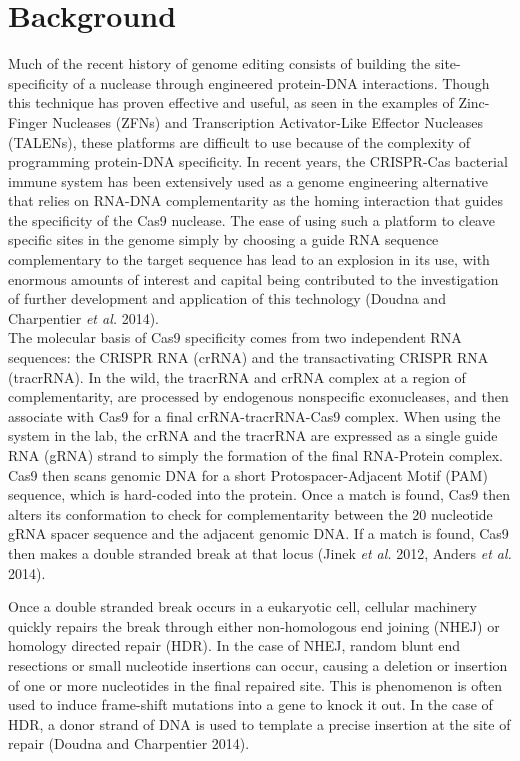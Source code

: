 \chapter{Background}
\label{Background}

Much of the recent history of genome editing consists of building the site-specificity of a nuclease through engineered protein-DNA interactions. Though this technique has proven effective and useful, as seen in the examples of Zinc-Finger Nucleases (ZFNs) and Transcription Activator-Like Effector Nucleases (TALENs), these platforms are difficult to use because of the complexity of programming protein-DNA specificity. In recent years, the CRISPR-Cas bacterial immune system has been extensively used as a genome engineering alternative that relies on RNA-DNA complementarity as the homing interaction that guides the specificity of the Cas9 nuclease. The ease of using such a platform to cleave specific sites in the genome simply by choosing a guide RNA sequence complementary to the target sequence has lead to an explosion in its use, with enormous amounts of interest and capital being contributed to the investigation of further development and application of this technology (Doudna and Charpentier \textit{et al.} 2014).\\

The molecular basis of Cas9 specificity comes from two independent RNA sequences: the CRISPR RNA (crRNA) and the transactivating CRISPR RNA (tracrRNA). In the wild, the tracrRNA and crRNA complex at a region of complementarity, are processed by endogenous nonspecific exonucleases, and then associate with Cas9 for a final crRNA-tracrRNA-Cas9 complex. When using the system in the lab, the crRNA and the tracrRNA are expressed as a single guide RNA (gRNA) strand to simply the formation of the final RNA-Protein complex. Cas9 then scans genomic DNA for a short Protospacer-Adjacent Motif (PAM) sequence, which is hard-coded into the protein. Once a match is found, Cas9 then alters its conformation to check for complementarity between the 20 nucleotide gRNA spacer sequence and the adjacent genomic DNA. If a match is found, Cas9 then makes a double stranded break at that locus (Jinek \textit{et al.} 2012, Anders \textit{et al.} 2014).

Once a double stranded break occurs in a eukaryotic cell, cellular machinery quickly repairs the break through either non-homologous end joining (NHEJ) or homology directed repair (HDR). In the case of NHEJ, random blunt end resections or small nucleotide insertions can occur, causing a deletion or insertion of one or more nucleotides in the final repaired site. This is phenomenon is often used to induce frame-shift mutations into a gene to  knock it out. In the case of HDR, a donor strand of DNA is used to template a precise insertion at the site of repair (Doudna and Charpentier 2014).

